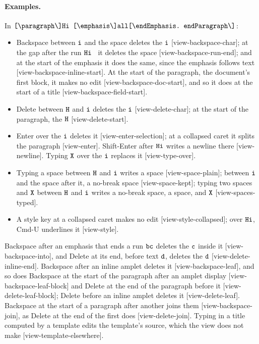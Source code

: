 \documentclass[11pt]{article}
\numberwithin{equation}{section}
\newcommand{\str}[1]{\ensuremath{\text{\texttt{#1}}}}
\newcommand{\bs}{\textbackslash}
\begin{document}
\paragraph{Examples.}  In
$\str{[\bs{}paragraph\bs]Hi\ [\bs{}emphasis\bs]all[\bs{}endEmphasis.\ endParagraph\bs]}$:
\begin{itemize}
\item Backspace between $\str{i}$ and the space deletes the $\str{i}$
      [view-backspace-char]; at the gap after the run $\str{Hi\ }$ it
      deletes the space [view-backspace-run-end]; and at the start of the
      emphasis it does the same, since the emphasis follows text
      [view-backspace-inline-start].  At the start of the paragraph, the
      document's first block, it makes no edit [view-backspace-doc-start],
      and so it does at the start of a title [view-backspace-field-start].
\item Delete between $\str{H}$ and $\str{i}$ deletes the $\str{i}$
      [view-delete-char]; at the start of the paragraph, the $\str{H}$
      [view-delete-start].
\item Enter over the $\str{i}$ deletes it [view-enter-selection]; at a
      collapsed caret it splits the paragraph [view-enter].  Shift-Enter
      after $\str{Hi}$ writes a newline there [view-newline].  Typing
      $\str{X}$ over the $\str{i}$ replaces it [view-type-over].
\item Typing a space between $\str{H}$ and $\str{i}$ writes a space
      [view-space-plain]; between $\str{i}$ and the space after it, a
      no-break space [view-space-kept]; typing two spaces and $\str{X}$
      between $\str{H}$ and $\str{i}$ writes a no-break space, a space,
      and $\str{X}$ [view-spaces-typed].
\item A style key at a collapsed caret makes no edit [view-style-collapsed];
      over $\str{Hi}$, Cmd-U underlines it [view-style].
\end{itemize}
Backspace after an emphasis that ends a run $\str{bc}$ deletes the
$\str{c}$ inside it [view-backspace-into], and Delete at its end, before
text $\str{d}$, deletes the $\str{d}$ [view-delete-inline-end].  Backspace
after an inline amplet deletes it [view-backspace-leaf], and so does
Backspace at the start of the paragraph after an amplet display
[view-backspace-leaf-block] and Delete at the end of the paragraph before
it [view-delete-leaf-block]; Delete before an inline amplet deletes it
[view-delete-leaf].  Backspace at the start of a paragraph after another
joins them [view-backspace-join], as Delete at the end of the first does
[view-delete-join].  Typing in a title computed by a template edits the
template's source, which the view does not make [view-template-elsewhere].
\end{document}

